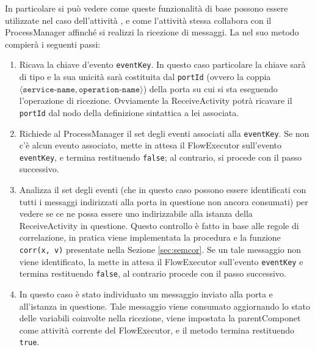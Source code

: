 
In particolare si può vedere come queste funzionalità di base possono essere
utilizzate nel caso dell'attività , e come
l'attività stessa collabora con il ProcessManager affinché si realizzi la
ricezione di messaggi. La  nel suo metodo
 compierà i seguenti passi:

\begin{enumerate}
  \item Ricava la chiave d'evento \texttt{eventKey}. In questo caso
  particolare la chiave sarà di tipo  e la sua
  unicità sarà costituita dal \texttt{portId} (ovvero la coppia 
  $\langle \texttt{service-name}, \texttt{operation-name} \rangle$) della porta
  su cui si sta eseguendo l'operazione di ricezione. Ovviamente la 
  ReceiveActivity potrà ricavare il \texttt{portId} dal nodo della definizione sintattica a lei associata.
  
  \item Richiede al ProcessManager il set degli eventi associati alla
  \texttt{eventKey}. Se non c'è alcun evento associato, mette in attesa il
  FlowExecutor sull'evento \texttt{eventKey}, e termina restituendo
  \texttt{false}; al contrario, si procede con il passo successivo.
  
  \item Analizza il set degli eventi (che in questo caso possono essere
  identificati con tutti i messaggi indirizzati alla porta in questione non
  ancora consumati) per vedere se ce ne possa essere uno indirizzabile alla
  istanza della ReceiveActivity in questione. Questo controllo \`e fatto in
  base alle regole di correlazione, in pratica viene implementata la procedura e
  la funzione \texttt{corr(x, v)} presentate nella Sezione \ref{sec:semcor}. Se
  un tale messaggio non viene identificato, la  mette in attesa il
  FlowExecutor sull'evento \texttt{eventKey} e termina restituendo
  \texttt{false}, al contrario procede con il passo successivo.
  
  \item In questo caso è stato individuato un messaggio inviato alla porta e
  all'istanza in questione. Tale messaggio viene consumato aggiornando lo stato
  delle variabili coinvolte nella ricezione, viene impostata la parentComponet come attività
  corrente del FlowExecutor, e il metodo termina restituendo \texttt{true}.
\end{enumerate}

